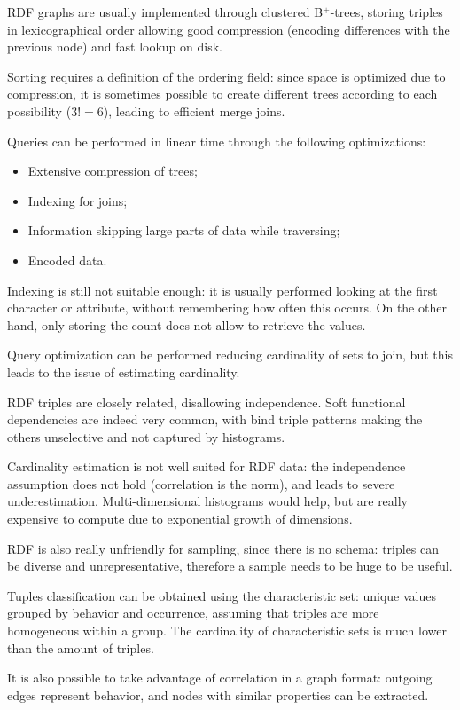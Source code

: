 RDF graphs are usually implemented through clustered B$^+$-trees, storing triples in lexicographical order allowing good compression (encoding differences with the previous node) and fast lookup on disk.

Sorting requires a definition of the ordering field: since space is optimized due to compression, it is sometimes possible to create different trees according to each possibility ($3! = 6$), leading to efficient merge joins. 

Queries can be performed in linear time through the following optimizations:
\begin{itemize}
	\item Extensive compression of trees;
	\item Indexing for joins;
	\item Information skipping large parts of data while traversing;
	\item Encoded data.
\end{itemize}

Indexing is still not suitable enough: it is usually performed looking at the first character or attribute, without remembering how often this occurs. On the other hand, only storing the count does not allow to retrieve the values.

Query optimization can be performed reducing cardinality of sets to join, but this leads to the issue of estimating cardinality.

RDF triples are closely related, disallowing independence. Soft functional dependencies are indeed very common, with bind triple patterns making the others unselective and not captured by histograms.

Cardinality estimation is not well suited for RDF data: the independence assumption does not hold (correlation is the norm), and leads to severe underestimation. Multi-dimensional histograms would help, but are really expensive to compute due to exponential growth of dimensions.

RDF is also really unfriendly for sampling, since there is no schema: triples can be diverse and unrepresentative, therefore a sample needs to be huge to be useful.

Tuples classification can be obtained using the characteristic set: unique values grouped by behavior and occurrence, assuming that triples are more homogeneous within a group. The cardinality of characteristic sets is much lower than the amount of triples.

It is also possible to take advantage of correlation in a graph format: outgoing edges represent behavior, and nodes with similar properties can be extracted.

